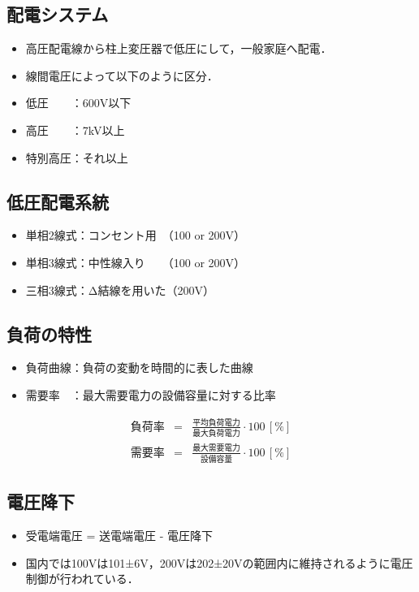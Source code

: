\subsection{配電システム}
\begin{itemize}
  \item 高圧配電線から柱上変圧器で低圧にして，一般家庭へ配電．
  \item 線間電圧によって以下のように区分．
  \item 低圧　　：600V以下
  \item 高圧　　：7kV以上
  \item 特別高圧：それ以上
\end{itemize}

\subsection{低圧配電系統}
\begin{itemize}
  \item 単相2線式：コンセント用　（100 or 200V）
  \item 単相3線式：中性線入り　　（100 or 200V）
  \item 三相3線式：Δ結線を用いた（200V）
\end{itemize}

\subsection{負荷の特性}
\begin{itemize}
  \item 負荷曲線：負荷の変動を時間的に表した曲線
  \item 需要率　：最大需要電力の設備容量に対する比率
\end{itemize}
\begin{eqnarray}
  \mbox{負荷率} &=& \frac{\mbox{平均負荷電力}}{\mbox{最大負荷電力}} \cdot 100\, [\textrm{\%}]\\
  \mbox{需要率} &=& \frac{\mbox{最大需要電力}}{\mbox{設備容量}} \cdot 100\, [\textrm{\%}]
\end{eqnarray}

\subsection{電圧降下}
\begin{itemize}
  \item 受電端電圧 = 送電端電圧 - 電圧降下
  \item 国内では100Vは101±6V，200Vは202±20Vの範囲内に維持されるように電圧制御が行われている．
\end{itemize}

